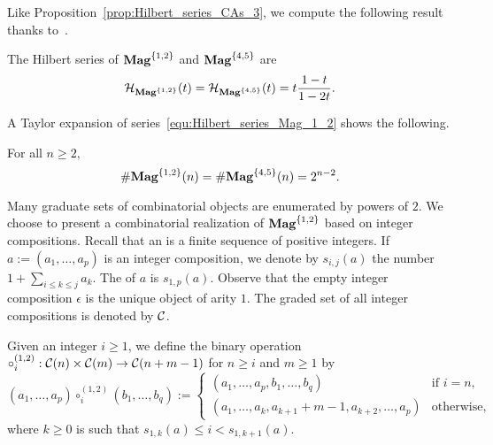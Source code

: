 Like Proposition~\ref{prop:Hilbert_series_CAs_3}, we compute the
following result thanks to~\cite{Gir18}.

\begin{Theorem} \label{thm:Hilbert_series_Mag_1_2}
    The Hilbert series of $\mathbf{Mag}^{\{1, 2\}}$ and $\mathbf{Mag}^{\{4, 5\}}$ are
    \begin{equation} \label{equ:Hilbert_series_Mag_1_2}
        \mathcal{H}_{\mathbf{Mag}^{\{1, 2\}}}(t)
        = \mathcal{H}_{\mathbf{Mag}^{\{4, 5\}}}(t) =
        t \frac{1 - t}{1 - 2t}.
    \end{equation}
\end{Theorem}
\medbreak

A Taylor expansion of series~\eqref{equ:Hilbert_series_Mag_1_2} shows
the following.
\medbreak

\begin{Proposition} \label{prop:Close_formula_Mag_1_2}
    For all $n \geq 2,$
    \begin{equation} \label{equ:Close_formula_Mag_1_2}
        \# \mathbf{Mag}^{\{1, 2\}}(n) = \# \mathbf{Mag}^{\{4, 5\}}(n) = 2^{n-2}.
    \end{equation}
\end{Proposition}
\medbreak

Many graduate sets of combinatorial objects are enumerated by powers of
$2$. We choose to present a combinatorial realization of
$\mathbf{Mag}^{\{1, 2\}}$ based on
integer compositions. Recall that an  is a
finite sequence of positive integers. If
$a := \left(a_1, \dots, a_p\right)$ is an integer composition, we denote
by $s_{i, j}(a)$ the number $1 + \sum_{i \leq k \leq j} a_k$. The
 of $a$ is $s_{1, p}(a)$. Observe that the empty integer
composition $\epsilon$ is the unique object of arity $1$. The graded set
of all integer compositions is denoted by $\mathcal{C}$.
\medbreak

Given an integer $i \geq 1$, we define the binary operation
\begin{math}
    \circ_i^{(1,2)} : \mathcal{C}(n) \times \mathcal{C}(m)
    \to\mathcal{C}(n + m - 1)
\end{math}
for $n \geq i$ and $m \geq 1$ by
\begin{equation}
    \left(a_1, \dots, a_p\right) \circ_i^{(1,2)}
    \left(b_1, \dots, b_{q}\right)
    :=
    \begin{cases}
        \left(a_1, \dots ,a_{p}, b_1, \dots ,b_{q}\right) &
        \mbox{if } i = n, \\
        \left(a_1, \dots, a_{k}, a_{k+1} + m - 1, a_{k + 2}, \dots,
            a_p\right)
            & \mbox{otherwise},
    \end{cases}
\end{equation}
where $k \geq 0$ is such that $s_{1, k}(a) \leq i < s_{1, k + 1}(a)$.
\medbreak

